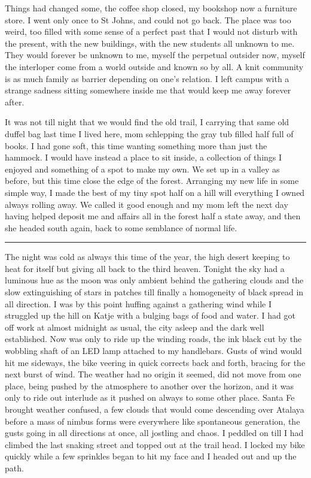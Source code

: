 \documentclass[ebook, 10pt, openright, onecolumn]{memoir}
\newcommand*\td[1]{
  \todo[inline]{
     #1 
  }
}
\newcommand*\starbreak{\fancybreak*{\Large{* * *}}}
\newcommand*\finish{\td{ ----- Finish this section -----}}
\begin{document}
Things had changed some, the coffee shop closed, my bookshop now a furniture
store. I went only once to St Johns, and could not go back.  The place was too
weird, too filled with some sense of a perfect past that I would not disturb
with the present, with the new buildings, with the new students all unknown to
me.  They would forever be unknown to me, myself the perpetual outsider now,
myself the interloper come from a world outside and known so by all.  A knit
community is as much family as barrier depending on one's relation.  I left
campus with a strange sadness sitting somewhere inside me that would keep me
away forever after.

It was not till night that we would find the old trail, I carrying that same old
duffel bag last time I lived here, mom schlepping the gray tub filled half full
of books.  I had gone soft, this time wanting something more than just the
hammock.  I would have instead a place to sit inside, a collection of things I
enjoyed and something of a spot to make my own.  We set up in a valley as
before, but this time close the edge of the forest.  Arranging my new life in
some simple way, I made the best of my tiny spot half on a hill will everything
I owned always rolling away.  We called it good enough and my mom left the next
day having helped deposit me and affairs all in the forest half a state away,
and then she headed south again, back to some semblance of normal life.  

\finish

\starbreak

The night was cold as always this time of the year, the high desert keeping to
heat for itself but giving all back to the third heaven.  Tonight the sky had a
luminous hue as the moon was only ambient behind the gathering clouds and the
slow extinguishing of stars in patches till finally a homogeneity of black
spread in all direction.  I was by this point huffing against a gathering wind
while I struggled up the hill on Katje with a bulging bags of food and water.  I
had got off work at almost midnight as usual, the city asleep and the dark well
established.  Now was only to ride up the winding roads, the ink black cut by
the wobbling shaft of an LED lamp attached to my handlebars.  Gusts of wind
would hit me sideways, the bike veering in quick corrects back and forth,
bracing for the next burst of wind.  The weather had no origin it seemed, did
not move from one place, being pushed by the atmosphere to another over the
horizon, and it was only to ride out interlude as it pushed on always to some
other place.  Santa Fe brought weather confused, a few clouds that would come
descending over Atalaya before a mass of nimbus forms were everywhere like
spontaneous generation, the gusts going in all directions at once, all jostling
and chaos.  I peddled on till I had climbed the last snaking street and topped
out at the trail head.  I locked my bike quickly while a few sprinkles began to
hit my face and I headed out and up the path.
\end{document}
